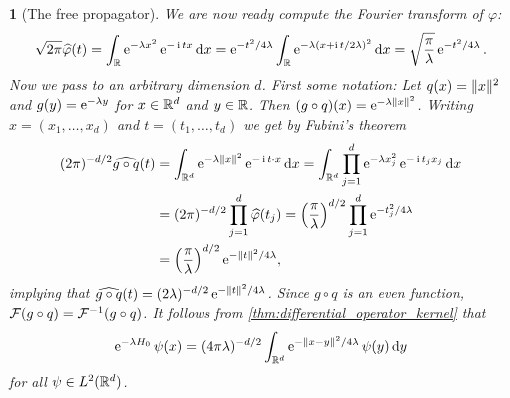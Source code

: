 \documentclass[article, a4paper, 11pt, oneside]{memoir}
\makeatletter
\let\phi\varphi
\numberwithin{equation}{chapter}
\theoremstyle{myexample}
\theoremstyle{myexample}
\theoremstyle{myexamplebreak}
\theoremstyle{myexamplebreak}
\newtheorem{examplebreak}[theorem]{\protect\@example}
\theoremstyle{nonumberplain}
\theoremstyle{MyNonumberplain}
\newcommand{\@example}{}
\renewcommand{\@example}{Example}%
\renewcommand{\@example}{Eksempel}%
\makeatother
\begin{document}
\begin{examplebreak}[The free propagator]
    We are now ready compute the Fourier transform of $\phi$:
    \begin{equation*}
        \sqrt{2\pi} \widehat \phi(t)
            = \int_\setR \e^{-\lambda x^2} \e^{-\iu tx} \dif x
            = \e^{-t^2/4\lambda} \int_\setR \e^{-\lambda (x + \iu t/2\lambda)^2} \dif x
            = \sqrt{\frac{\pi}{\lambda}} \e^{-t^2/4\lambda}.
    \end{equation*}
    Now we pass to an arbitrary dimension $d$. First some notation: Let $q(x) = \lVert x\rVert^2$ and $g(y) = \operatorname{\mathrm{e}}^{-\lambda y}$ for $x \in \mathbb{R}^d$ and $y \in \mathbb{R}$. Then $(g \circ q)(x) = \operatorname{\mathrm{e}}^{-\lambda \lVert x\rVert^2}$. Writing $x = (x_1, \ldots, x_d)$ and $t = (t_1, \ldots, t_d)$ we get by Fubini's theorem
    \begin{align*}
        (2\pi)^{-d/2} \widehat{g \circ q}(t)
            &= \int_{\setR^d} \e^{-\lambda \norm{x}^2} \e^{-\iu t \cdot x} \dif x
             = \int_{\setR^d} \prod_{j=1}^d \e^{-\lambda x_j^2} \e^{-\iu t_j x_j} \dif x \\
            &= (2\pi)^{-d/2} \prod_{j=1}^d \widehat \phi(t_j)
             = \Big( \frac{\pi}{\lambda} \Big)^{d/2} \prod_{j=1}^d \e^{-t_j^2/4\lambda} \\
            &= \Big( \frac{\pi}{\lambda} \Big)^{d/2} \e^{-\norm{t}^2/4\lambda},
    \end{align*}
    implying that $\widehat{g \circ q}(t) = (2\lambda)^{-d/2} \operatorname{\mathrm{e}}^{-\lVert t\rVert^2/4\lambda}$. Since $g \circ q$ is an even function, $\mathcal{F}(g \circ q) = \mathcal{F}^{-1}(g \circ q)$. It follows from \cref{thm:differential_operator_kernel} that
    \begin{equation*}
        \operatorname{\mathrm{e}}^{-\lambda H_0} \psi(x)
            = (4\pi \lambda)^{-d/2} \int_{\mathbb{R}^d} \operatorname{\mathrm{e}}^{-\lVert x-y\rVert^2/4\lambda} \psi(y) \mathop{}\!\mathrm{d} y
    \end{equation*}
    for all $\psi \in L^2(\mathbb{R}^d)$.
    

\end{examplebreak}
\end{document}
